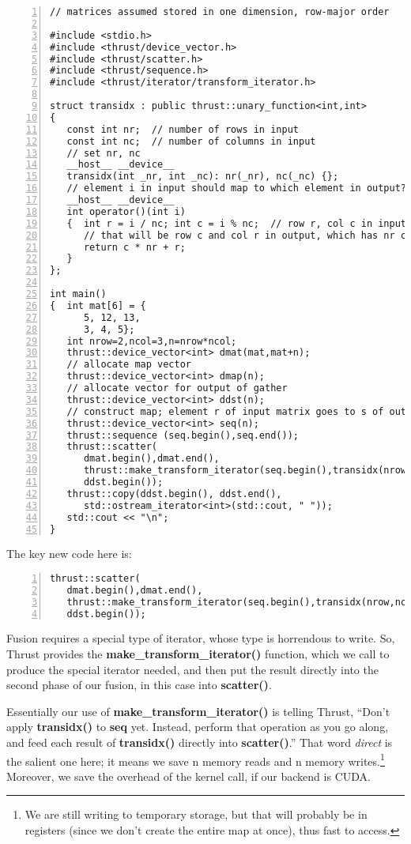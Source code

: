 \begin{lstlisting}[numbers=left]
// matrices assumed stored in one dimension, row-major order

#include <stdio.h>
#include <thrust/device_vector.h>
#include <thrust/scatter.h>
#include <thrust/sequence.h>
#include <thrust/iterator/transform_iterator.h>

struct transidx : public thrust::unary_function<int,int>
{
   const int nr;  // number of rows in input
   const int nc;  // number of columns in input
   // set nr, nc
   __host__ __device__
   transidx(int _nr, int _nc): nr(_nr), nc(_nc) {};
   // element i in input should map to which element in output?
   __host__ __device__
   int operator()(int i)
   {  int r = i / nc; int c = i % nc;  // row r, col c in input
      // that will be row c and col r in output, which has nr cols
      return c * nr + r;
   }
};

int main()
{  int mat[6] = {
      5, 12, 13,
      3, 4, 5};
   int nrow=2,ncol=3,n=nrow*ncol;
   thrust::device_vector<int> dmat(mat,mat+n);
   // allocate map vector
   thrust::device_vector<int> dmap(n);
   // allocate vector for output of gather
   thrust::device_vector<int> ddst(n);
   // construct map; element r of input matrix goes to s of output
   thrust::device_vector<int> seq(n);
   thrust::sequence (seq.begin(),seq.end());
   thrust::scatter(
      dmat.begin(),dmat.end(),
      thrust::make_transform_iterator(seq.begin(),transidx(nrow,ncol)),
      ddst.begin());
   thrust::copy(ddst.begin(), ddst.end(), 
      std::ostream_iterator<int>(std::cout, " "));
   std::cout << "\n";
}
\end{lstlisting}

The key new code here is:

\begin{lstlisting}[numbers=left]
thrust::scatter(
   dmat.begin(),dmat.end(),
   thrust::make_transform_iterator(seq.begin(),transidx(nrow,ncol)),
   ddst.begin());
\end{lstlisting}

Fusion requires a special type of iterator, whose type is horrendous to
write.  So, Thrust provides the {\bf make\_transform\_iterator()}
function, which we call to produce the special iterator needed, and then
put the result directly into the second phase of our fusion, in this
case into {\bf scatter()}.  

Essentially our use of {\bf make\_transform\_iterator()} is telling
Thrust, ``Don't apply {\bf transidx()} to {\bf seq} yet.  Instead,
perform that operation as you go along, and feed each result of {\bf
transidx()} directly into {\bf scatter()}.''  That word {\it direct} is
the salient one here; it means we save n memory reads and n memory
writes.\footnote{We are still writing to temporary storage, but that
will probably be in registers (since we don't create the entire map at
once), thus fast to access.} Moreover, we save the overhead of the
kernel call, if our backend is CUDA.


